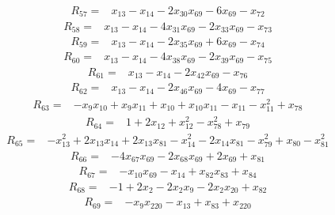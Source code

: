 \[
\begin{aligned}
R_{57}={}&x_{13}-x_{14}-2x_{30}x_{69}-6x_{69}-x_{72}
\end{aligned}
\]
\[
\begin{aligned}
R_{58}={}&x_{13}-x_{14}-4x_{31}x_{69}-2x_{33}x_{69}-x_{73}
\end{aligned}
\]
\[
\begin{aligned}
R_{59}={}&x_{13}-x_{14}-2x_{35}x_{69}+6x_{69}-x_{74}
\end{aligned}
\]
\[
\begin{aligned}
R_{60}={}&x_{13}-x_{14}-4x_{38}x_{69}-2x_{39}x_{69}-x_{75}
\end{aligned}
\]
\[
\begin{aligned}
R_{61}={}&x_{13}-x_{14}-2x_{42}x_{69}-x_{76}
\end{aligned}
\]
\[
\begin{aligned}
R_{62}={}&x_{13}-x_{14}-2x_{46}x_{69}-4x_{69}-x_{77}
\end{aligned}
\]
\[
\begin{aligned}
R_{63}={}&-x_{9}x_{10}+x_{9}x_{11}+x_{10}+x_{10}x_{11}-x_{11}-x_{11}^{2}+x_{78}
\end{aligned}
\]
\[
\begin{aligned}
R_{64}={}&1+2x_{12}+x_{12}^{2}-x_{78}^{2}+x_{79}
\end{aligned}
\]
\[
\begin{aligned}
R_{65}={}&-x_{13}^{2}+2x_{13}x_{14}+2x_{13}x_{81}-x_{14}^{2}-2x_{14}x_{81}-x_{79}^{2}+x_{80}-x_{81}^{2}
\end{aligned}
\]
\[
\begin{aligned}
R_{66}={}&-4x_{67}x_{69}-2x_{68}x_{69}+2x_{69}+x_{81}
\end{aligned}
\]
\[
\begin{aligned}
R_{67}={}&-x_{10}x_{69}-x_{14}+x_{82}x_{83}+x_{84}
\end{aligned}
\]
\[
\begin{aligned}
R_{68}={}&-1+2x_{2}-2x_{2}x_{9}-2x_{2}x_{20}+x_{82}
\end{aligned}
\]
\[
\begin{aligned}
R_{69}={}&-x_{9}x_{220}-x_{13}+x_{83}+x_{220}
\end{aligned}
\]
